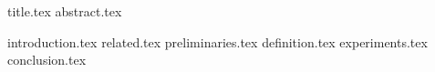 \documentclass[11pt]{llncs}
\begin{document}
{title.tex}
\thispagestyle{plain}
{abstract.tex}

{introduction.tex}
{related.tex}
{preliminaries.tex}
{definition.tex}
{experiments.tex}
{conclusion.tex}



\end{document}
